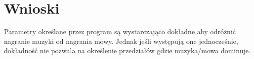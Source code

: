 \documentclass[a4paper]{article}
\begin{document}
\section{Wnioski}
Parametry określane przez program są wystarczająco dokładne aby odróżnić nagranie muzyki od nagrania mowy. Jednak jeśli występują one jednocześnie, dokładność nie pozwala na określenie przedziałów gdzie muzyka/mowa dominuje.

\lstset{basicstyle=\ttfamily}
\lstset{style=sharpc}
\begin{lstlisting}
\end{lstlisting}
\end{document}
